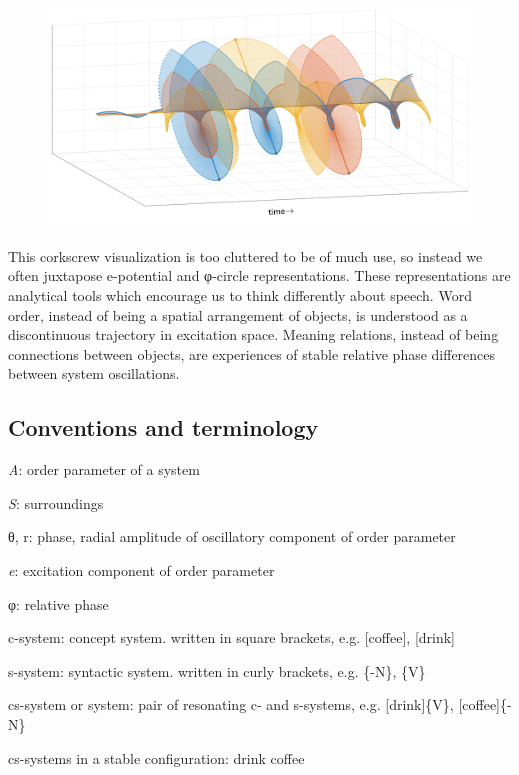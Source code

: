   
\begin{figure}
\includegraphics[width=\textwidth]{figures/Tilsen-img28.png}
\caption{\missingcaption}
\label{fig:}
\end{figure}
 

  This corkscrew visualization is too cluttered to be of much use, so instead we often juxtapose e-potential and φ{}-circle representations. These representations are analytical tools which encourage us to think differently about speech. Word order, instead of being a spatial arrangement of objects, is understood as a discontinuous trajectory in excitation space. Meaning relations, instead of being connections between objects, are experiences of stable relative phase differences between system oscillations.

\subsection{Conventions and terminology}

\textit{A}: order parameter of a system

\textit{S}: surroundings

θ, r: phase, radial amplitude of oscillatory component of order parameter

\textit{e}: excitation component of order parameter

φ: relative phase

c-system: concept system. written in square brackets, e.g. [coffee], [drink]

s-system: syntactic system. written in curly brackets, e.g. \{-N\}, \{V\}

cs-system or system: pair of resonating c- and s-systems, e.g. [drink]\{V\}, [coffee]\{-N\}

cs-systems in a stable configuration: {\textbar}drink coffee{\textbar}

